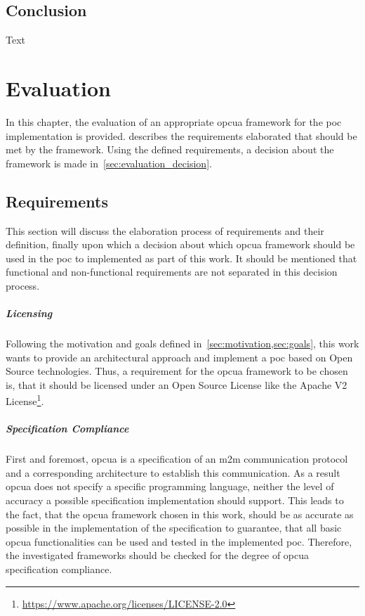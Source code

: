 \documentclass[
a4paper,
twoside,
headsepline,
cleardoublepage=empty,
parskip=half,
draft=false
]{scrbook}
\begin{document}
		\section{Conclusion}\label{sec:state_of_the_research_conclusion}
		
			Text
			
	\chapter{Evaluation}\label{ch:evaluation}
	
		In this chapter, the evaluation of an appropriate \gls{opcua} framework for the \gls{poc} implementation is provided.  describes the requirements elaborated that should be met by the framework. 
		Using the defined requirements, a decision about the framework is made in~\cref{sec:evaluation_decision}.
		
		\section{Requirements}\label{sec:evaluation_requirements}
		
			This section will discuss the elaboration process of requirements and their definition, finally upon which a decision about which \gls{opcua} framework should be used in the \gls{poc} to implemented as part of this work. 
			It should be mentioned that functional and non-functional requirements are not separated in this decision process.
			
			\paragraph{Licensing} Following the motivation and goals defined in~\cref{sec:motivation,sec:goals}, this work wants to provide an architectural approach and implement a \gls{poc} based on Open Source technologies.
			Thus, a requirement for the \gls{opcua} framework to be chosen is, that it should be licensed under an Open Source License like the Apache V2 License\footnote{\url{https://www.apache.org/licenses/LICENSE-2.0}}.
			
			\paragraph{Specification Compliance} First and foremost, \gls{opcua} is a specification of an \gls{m2m} communication protocol and a corresponding architecture to establish this communication. 
			As a result \gls{opcua} does not specify a specific programming language, neither the level of accuracy a possible specification implementation should support. 
			This leads to the fact, that the \gls{opcua} framework chosen in this work, should be as accurate as possible in the implementation of the specification to guarantee, that all basic \gls{opcua} functionalities can be used and tested in the implemented \gls{poc}. 
			Therefore, the investigated frameworks should be checked for the degree of \gls{opcua} specification compliance.
			
\end{document}
